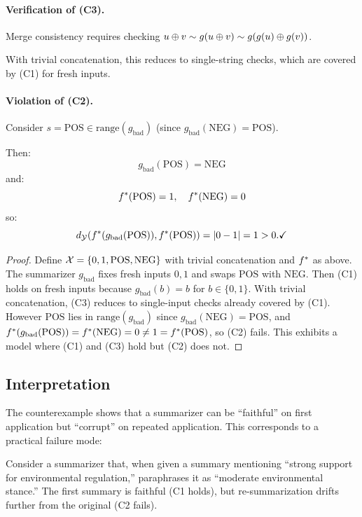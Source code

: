 \paragraph{Verification of (C3).}
Merge consistency requires checking $u \oplus v \sim g(u \oplus v) \sim g(g(u) \oplus g(v))$.

With trivial concatenation, this reduces to single-string checks, which are covered by (C1) for fresh inputs.

\paragraph{Violation of (C2).}
Consider $s = \text{POS} \in \text{range}(g_{\text{bad}})$ (since $g_{\text{bad}}(\text{NEG}) = \text{POS}$).

Then:
\[
g_{\text{bad}}(\text{POS}) = \text{NEG}
\]
and:
\[
f^{\ast}(\text{POS}) = 1, \quad f^{\ast}(\text{NEG}) = 0
\]
so:
\[
d_{\mathcal{Y}}(f^{\ast}(g_{\text{bad}}(\text{POS})), f^{\ast}(\text{POS})) = |0 - 1| = 1 > 0. \checkmark
\]

\begin{proof}
Define $\mathcal{X}=\{0,1,\text{POS},\text{NEG}\}$ with trivial concatenation and $f^{\ast}$ as above. The summarizer $g_{\text{bad}}$ fixes fresh inputs $0,1$ and swaps $\text{POS}$ with $\text{NEG}$. Then (C1) holds on fresh inputs because $g_{\text{bad}}(b)=b$ for $b\in\{0,1\}$. With trivial concatenation, (C3) reduces to single-input checks already covered by (C1). However $\text{POS}$ lies in $\mathrm{range}(g_{\text{bad}})$ since $g_{\text{bad}}(\text{NEG})=\text{POS}$, and
$f^{\ast}(g_{\text{bad}}(\text{POS}))=f^{\ast}(\text{NEG})=0\ne 1=f^{\ast}(\text{POS})$,
so (C2) fails. This exhibits a model where (C1) and (C3) hold but (C2) does not.
\end{proof}

\subsection{Interpretation}

The counterexample shows that a summarizer can be ``faithful'' on first application but ``corrupt'' on repeated application. This corresponds to a practical failure mode:

\begin{example}
Consider a summarizer that, when given a summary mentioning ``strong support for environmental regulation,'' paraphrases it as ``moderate environmental stance.'' The first summary is faithful (C1 holds), but re-summarization drifts further from the original (C2 fails).
\end{example}

